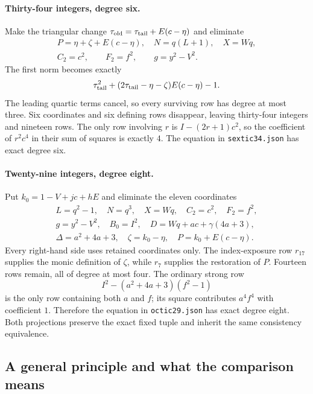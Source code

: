 \paragraph{Thirty-four integers, degree six.}
Make the triangular change
$\tau_{\rm old}=\tau_{\rm tail}+E(c-\eta)$ and eliminate
\[
 \begin{gathered}
 P=\eta+\zeta+E(c-\eta),\quad N=q(L+1),\quad X=Wq,\\
 C_2=c^2,\qquad F_2=f^2,\qquad g=y^2-V^2.
 \end{gathered}
\]
The first norm becomes exactly
\[
 \tau_{\rm tail}^2+
 (2\tau_{\rm tail}-\eta-\zeta)E(c-\eta)-1.
\]
The leading quartic terms cancel, so every surviving row has degree at
most three.  Six coordinates and six defining rows disappear, leaving
thirty-four integers and nineteen rows.  The only row involving $r$ is
$I-(2r+1)c^2$, so the coefficient of $r^2c^4$ in their sum of squares
is exactly $4$.  The equation in \texttt{sextic34.json} has exact degree six.

\paragraph{Twenty-nine integers, degree eight.}
Put $k_0=1-V+jc+hE$ and eliminate the eleven coordinates
\[
\begin{gathered}
 L=q^2-1,\quad N=q^3,\quad X=Wq,\quad C_2=c^2,\quad F_2=f^2,\\
 g=y^2-V^2,\quad B_0=I^2,\quad
 D=Wq+ac+\gamma(4a+3),\\
 \Delta=a^2+4a+3,\quad
 \zeta=k_0-\eta,\quad P=k_0+E(c-\eta).
\end{gathered}
\]
Every right-hand side uses retained coordinates only.  The index-exposure
row $r_{17}$ supplies the monic definition of $\zeta$, while $r_7$
supplies the restoration of $P$.  Fourteen rows remain, all of degree at
most four.  The ordinary strong row
\[
 I^2-(a^2+4a+3)(f^2-1)
\]
is the only row containing both $a$ and $f$; its square contributes
$a^4f^4$ with coefficient $1$.  Therefore the equation in
\texttt{octic29.json} has exact degree eight.  Both projections preserve
the exact fixed tuple and inherit the same consistency equivalence.

\subsection{A general principle and what the comparison means}
\label{int:principle}

